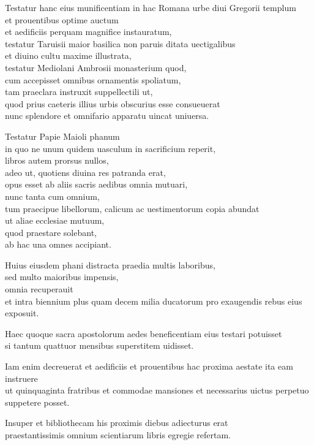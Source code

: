 \documentclass[a5paper,twoside]{article}
\begin{document}
Testatur hanc eius munificentiam in hac Romana urbe diui Gregorii templum \\
et prouentibus optime auctum \\
et aedificiis perquam magnifice instauratum, \\
testatur Taruisii maior basilica non paruis ditata uectigalibus \\
et diuino cultu maxime illustrata, \\
testatur Mediolani Ambrosii monasterium quod, \\
cum accepisset omnibus ornamentis spoliatum, \\
tam praeclara instruxit suppellectili ut, \\
quod prius caeteris illius urbis obscurius esse consueuerat \\
nunc splendore et omnifario apparatu uincat uniuersa. 

Testatur Papie Maioli phanum \\
in quo ne unum quidem uasculum in sacrificium reperit, \\
libros autem prorsus nullos, \\
adeo ut, quotiens diuina res patranda erat, \\
opus esset ab aliis sacris aedibus omnia mutuari, \\
nunc tanta cum omnium, \\
tum praecipue libellorum, calicum ac uestimentorum copia abundat \\
ut aliae ecclesiae mutuum, \\
quod praestare solebant, \\
ab hac una omnes accipiant.  

Huius eiusdem phani distracta praedia multis laboribus, \\
sed multo maioribus impensis, \\
omnia recuperauit \\
et intra biennium plus quam decem milia ducatorum pro exaugendis rebus eius exposuit.  

Haec quoque sacra apostolorum aedes beneficentiam eius testari potuisset \\
si tantum quattuor mensibus superstitem uidisset.  

Iam enim decreuerat et aedificiis et prouentibus hac proxima aestate ita eam instruere \\
ut quinquaginta fratribus et commodae mansiones et necessarius uictus perpetuo suppetere posset.  

Insuper et bibliothecam his proximis diebus adiecturus erat \\
praestantissimis omnium scientiarum libris egregie refertam.  
\end{document}
